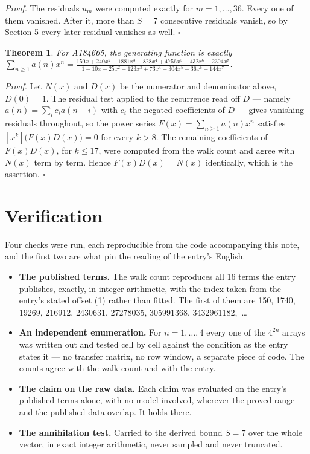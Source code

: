 \documentclass[11pt]{article}
\newtheorem{theorem}{Theorem}
\theoremstyle{definition}
\begin{document}
{\itshape Proof.} The residuals $u_m$ were computed exactly for $m = 1,\dots,36$. Every one of them vanished. After it, more than $S = 7$ consecutive residuals vanish, so by Section 5 every later residual vanishes as well. $\square$

\begin{theorem} For A184665, the generating function is exactly $\sum_{n\ge 1} a(n)x^n = \frac{150x + 240x^{2} - 1881x^{3} - 828x^{4} + 4756x^{5} + 432x^{6} - 2304x^{7}}{1 - 10x - 25x^{2} + 123x^{3} + 73x^{4} - 304x^{5} - 36x^{6} + 144x^{7}}$.\end{theorem}

{\itshape Proof.} Let $N(x)$ and $D(x)$ be the numerator and denominator above, $D(0)=1$. The residual test applied to the recurrence read off $D$ --- namely $a(n) = \sum_i c_i a(n-i)$ with $c_i$ the negated coefficients of $D$ --- gives vanishing residuals throughout, so the power series $F(x)=\sum_{n\ge 1}a(n)x^n$ satisfies $[x^k]\bigl(F(x)D(x)\bigr) = 0$ for every $k > 8$. The remaining coefficients of $F(x)D(x)$, for $k \le 17$, were computed from the walk count and agree with $N(x)$ term by term. Hence $F(x)D(x) = N(x)$ identically, which is the assertion. $\square$

\section{Verification}

Four checks were run, each reproducible from the code accompanying this note, and the first two are what pin the reading of the entry's English.

\begin{itemize}

\item {\bfseries The published terms.} The walk count reproduces all 16 terms the entry publishes, exactly, in integer arithmetic, with the index taken from the entry's stated offset (1) rather than fitted. The first of them are 150, 1740, 19269, 216912, 2430631, 27278035, 305991368, 3432961182,~\dots

\item {\bfseries An independent enumeration.} For $n = 1,\dots,4$ every one of the $4^{2n}$ arrays was written out and tested cell by cell against the condition as the entry states it --- no transfer matrix, no row window, a separate piece of code. The counts agree with the walk count and with the entry.

\item {\bfseries The claim on the raw data.} Each claim was evaluated on the entry's published terms alone, with no model involved, wherever the proved range and the published data overlap. It holds there.

\item {\bfseries The annihilation test.} Carried to the derived bound $S = 7$ over the whole vector, in exact integer arithmetic, never sampled and never truncated.

\end{itemize}
\end{document}
